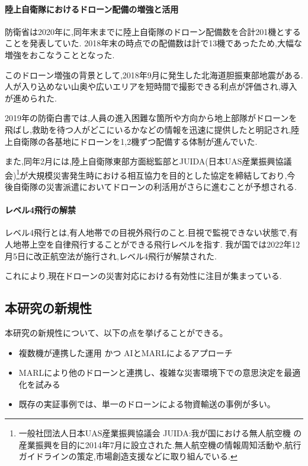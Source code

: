 \documentclass{article}[jsarticle]
\begin{document}
\paragraph{陸上自衛隊におけるドローン配備の増強と活用}
防衛省は2020年に,同年末までに陸上自衛隊のドローン配備数を合計201機とすることを発表\cite{news02}していた.
2018年末の時点での配備数は計で13機であったため,大幅な増強をおこなうこととなった.\par
このドローン増強の背景として,2018年9月に発生した北海道胆振東部地震がある.人が入り込めない山奥や広いエリアを短時間で撮影できる利点が評価され,導入が進められた.\par
2019年の防衛白書では,人員の進入困難な箇所や方向から地上部隊がドローンを飛ばし,救助を待つ人がどこにいるかなどの情報を迅速に提供したと明記され,陸上自衛隊の各基地にドローンを1,2機ずつ配備する体制が進んでいた.\par
また,同年2月には,陸上自衛隊東部方面総監部とJUIDA(日本UAS産業振興協議会)\footnote{一般社団法人日本UAS産業振興協議会 JUIDA:我が国における無人航空機
の産業振興を目的に2014年7月に設立された.無人航空機の情報周知活動や,航行ガイドラインの策定,市場創造支援などに取り組んでいる.}が大規模災害発生時における相互協力を目的とした協定を締結しており,今後自衛隊の災害派遣においてドローンの利活用がさらに進むことが予想される.
\paragraph{レベル4飛行の解禁} \par
レベル4飛行とは,有人地帯での目視外飛行のこと.目視で監視できない状態で,有人地帯上空を自律飛行することができる飛行レベルを指す.
我が国では2022年12月5日に改正航空法が施行され,レベル4飛行が解禁された\cite{doc01}.\par 
これにより,現在ドローンの災害対応における有効性に注目が集まっている.

\subsection{本研究の新規性}
本研究の新規性について、以下の点を挙げることができる。
\begin{itemize}
    \item 複数機が連携した運用 かつ AIとMARLによるアプローチ
    \item MARLにより他のドローンと連携し、複雑な災害環境下での意思決定を最適化を試みる
    \item 既存の実証事例では、単一のドローンによる物資輸送の事例が多い。
\end{itemize}
\end{document}

